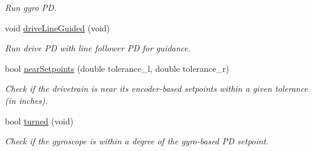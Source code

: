 \begin{DoxyCompactItemize}
\begin{DoxyCompactList}\small\item\em Run gyro PD. \end{DoxyCompactList}\item 
void \hyperlink{class_drive_train_ace3dfd00c11b3d001179370c2aa79be4}{drive\+Line\+Guided} (void)
\begin{DoxyCompactList}\small\item\em Run drive PD with line follower PD for guidance. \end{DoxyCompactList}\item 
bool \hyperlink{class_drive_train_a3817b51633041e331de658be05396ec9}{near\+Setpoints} (double tolerance\+\_\+l, double tolerance\+\_\+r)
\begin{DoxyCompactList}\small\item\em Check if the drivetrain is near its encoder-\/based setpoints within a given tolerance (in inches). \end{DoxyCompactList}\item 
bool \hyperlink{class_drive_train_ab3b73991a0be9e840d3e4903d41dadec}{turned} (void)
\begin{DoxyCompactList}\small\item\em Check if the gyroscope is within a degree of the gyro-\/based PD setpoint. \end{DoxyCompactList}\end{DoxyCompactItemize}
